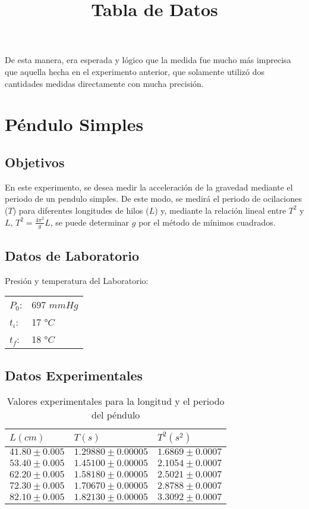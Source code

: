 \documentclass[a4paper,12pt]{article}
\begin{document}
De esta manera, era esperada y lógico que la medida fue mucho más
imprecisa que aquella hecha en el experimento anterior, que solamente 
utilizó dos cantidades medidas directamente con mucha precisión.  
\pagebreak

\section{Péndulo Simples}

\subsection{Objetivos}
En este experimento, se desea medir la acceleración de la gravedad mediante el periodo
de un pendulo simples. De este modo, se medirá el periodo de ocilaciones ($T$) para diferentes
longitudes de hilos ($L$) y, mediante la relación lineal entre $T^2$ y $L$, $T^2=\frac{4\pi^2}{g} L$,
se puede determinar $g$ por el método de mínimos cuadrados.


\subsection{Datos de Laboratorio}
\begin{table}[h!]
\centering
\title{\textbf{Tabla de Datos}\\}
Presión y temperatura del Laboratorio:

\begin{tabular}{|ll|}
\hline
$P_0$: & 697 $mmHg$ \\
$t_i$: & 17 °$C$ \\
$t_f$: & 18 °$C$ \\
\hline
\end{tabular}
\end{table}

\subsection{Datos Experimentales}
\begin{table}[h!]
  \centering
  \caption{Valores experimentales para la longitud y el periodo del péndulo}
  \begin{tabular}{|l|l|l|}
    \hline
    $L(cm)$ & $T(s)$ & $T^2(s^2)$\\
    \hline
    $41.80 \pm 0.005$ & $1.29880\pm 0.00005$ & $1.6869 \pm 0.0007$\\
    \hline
    $53.40\pm 0.005$ & $1.45100\pm 0.00005$ & $2.1054\pm 0.0007$\\
    \hline
    $62.20\pm 0.005$ & $1.58180 \pm 0.00005$ & $2.5021 \pm 0.0007$ \\
    \hline
    $72.30 \pm 0.005$ & $1.70670 \pm 0.00005$ & $2.8788 \pm 0.0007$\\
    \hline
    $82.10 \pm 0.005$ & $1.82130 \pm 0.00005$ & $3.3092 \pm 0.0007$\\
    \hline
  \end{tabular}
\end{table}
\pagebreak
\end{document}

